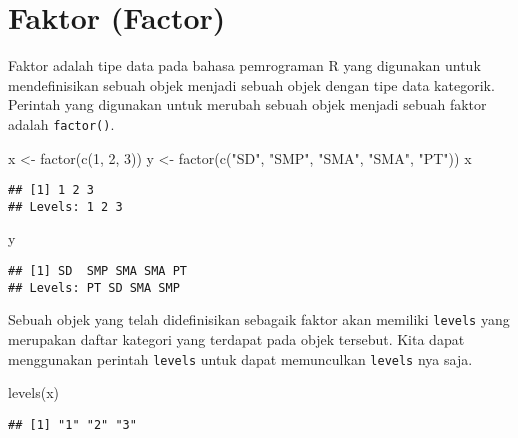 \documentclass[
]{book}
\newenvironment{Shaded}{\begin{snugshade}}{\end{snugshade}}
\newcommand{\DecValTok}[1]{\textcolor[rgb]{0.00,0.00,0.81}{#1}}
\newcommand{\FunctionTok}[1]{\textcolor[rgb]{0.00,0.00,0.00}{#1}}
\newcommand{\NormalTok}[1]{#1}
\newcommand{\OtherTok}[1]{\textcolor[rgb]{0.56,0.35,0.01}{#1}}
\newcommand{\StringTok}[1]{\textcolor[rgb]{0.31,0.60,0.02}{#1}}
\begin{document}
\hypertarget{factor}{%
\section{Faktor (Factor)}\label{factor}}

Faktor adalah tipe data pada bahasa pemrograman R yang digunakan untuk mendefinisikan sebuah objek menjadi sebuah objek dengan tipe data kategorik. Perintah yang digunakan untuk merubah sebuah objek menjadi sebuah faktor adalah \texttt{factor()}.

\begin{Shaded}
\begin{Highlighting}[]
\NormalTok{x }\OtherTok{\textless{}{-}} \FunctionTok{factor}\NormalTok{(}\FunctionTok{c}\NormalTok{(}\DecValTok{1}\NormalTok{, }\DecValTok{2}\NormalTok{, }\DecValTok{3}\NormalTok{))}
\NormalTok{y }\OtherTok{\textless{}{-}} \FunctionTok{factor}\NormalTok{(}\FunctionTok{c}\NormalTok{(}\StringTok{"SD"}\NormalTok{, }\StringTok{"SMP"}\NormalTok{, }\StringTok{"SMA"}\NormalTok{, }\StringTok{"SMA"}\NormalTok{, }\StringTok{"PT"}\NormalTok{))}
\NormalTok{x}
\end{Highlighting}
\end{Shaded}

\begin{verbatim}
## [1] 1 2 3
## Levels: 1 2 3
\end{verbatim}

\begin{Shaded}
\begin{Highlighting}[]
\NormalTok{y}
\end{Highlighting}
\end{Shaded}

\begin{verbatim}
## [1] SD  SMP SMA SMA PT 
## Levels: PT SD SMA SMP
\end{verbatim}

Sebuah objek yang telah didefinisikan sebagaik faktor akan memiliki \texttt{levels} yang merupakan daftar kategori yang terdapat pada objek tersebut. Kita dapat menggunakan perintah \texttt{levels} untuk dapat memunculkan \texttt{levels} nya saja.

\begin{Shaded}
\begin{Highlighting}[]
\FunctionTok{levels}\NormalTok{(x)}
\end{Highlighting}
\end{Shaded}

\begin{verbatim}
## [1] "1" "2" "3"
\end{verbatim}
\end{document}
